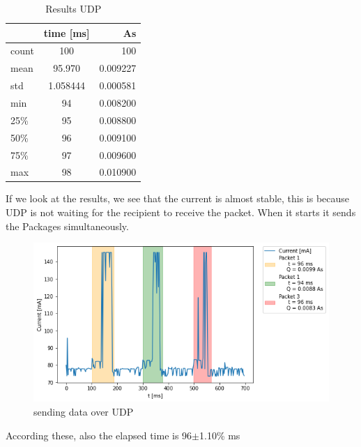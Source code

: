 \begin{table}[htbp]
\begin{center}
\caption{Results UDP}
\label{tab:table1}
\renewcommand{\arraystretch}{1.8}
\begin{tabular}{l|c|r}
& \textbf{time [ms]} & \textbf{As}\\
\hline
count & 100 & 100\\
mean & 95.970 & 0.009227\\
std & 1.058444 & 0.000581\\
min & 94 & 0.008200\\
25\% & 95 & 0.008800\\
50\% & 96 & 0.009100\\
75\% & 97 & 0.009600\\
max & 98 & 0.010900\\
\end{tabular}
\end{center}
\end{table}
\linebreak
If we look at the results, we see that the current is almost stable,
this is because UDP is not waiting for the recipient to receive the packet.
When it starts it sends the Packages simultaneously.\linebreak\linebreak
\begin{figure}[h!]
\centering
\includegraphics[width = 1 \linewidth]{fig/udp_tcp/udp_s_m.png}
\caption{sending data over UDP}
\label{fig:udp_s_m}
\end{figure}
\linebreak\linebreak
According these, also the elapsed time is 96$\pm$1.10\% ms
\linebreak
